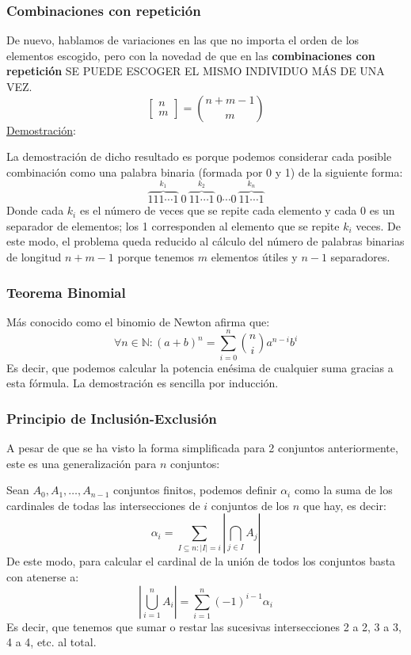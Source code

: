 \documentclass[10pt,a4paper,openright]{book}
\begin{document}
\subsubsection*{Combinaciones con repetición}
De nuevo, hablamos de variaciones en las que no importa el orden de los elementos escogido, pero con la novedad de que en las \textbf{combinaciones con repetición} SE PUEDE ESCOGER EL MISMO INDIVIDUO MÁS DE UNA VEZ. 
$$\begin{bmatrix} n \\ m\end{bmatrix} = \binom{n+m-1}{m}$$
\underline{Demostración}:

La demostración de dicho resultado es porque podemos considerar cada posible combinación como una palabra binaria (formada por 0 y 1) de la siguiente forma:
$$\overbrace{111\cdots 1}^{k_1} \ 0 \ \overbrace{11\cdots 1}^{k_2} \ 0 \cdots 0 \ \overbrace{11\cdots 1}^{k_n}$$
Donde cada $k_i$ es el número de veces que se repite cada elemento y cada $0$ es un separador de elementos; los 1 corresponden al elemento que se repite $k_i$ veces. De este modo, el problema queda reducido al cálculo del número de palabras binarias de longitud $n+m-1$ porque tenemos $m$ elementos útiles y $n-1$ separadores.

\subsubsection*{Teorema Binomial}
Más conocido como el binomio de Newton afirma que:
$$\forall n \in \mathbb N: (a+b)^n = \sum_{i = 0}^{n} \binom{n}{i} a^{n-i}b^i$$
Es decir, que podemos calcular la potencia enésima de cualquier suma gracias a esta fórmula. La demostración es sencilla por inducción.

\subsubsection*{Principio de Inclusión-Exclusión}
A pesar de que se ha visto la forma simplificada para 2 conjuntos anteriormente, este es una generalización para $n$ conjuntos:

Sean $A_0, A_1, \ldots, A_{n-1}$ conjuntos finitos, podemos definir $\alpha_i$ como la suma de los cardinales de todas las intersecciones de $i$ conjuntos de los $n$ que hay, es decir:
$$\alpha_i = \sum_{I\subseteq n: |I|=i} | \bigcap_{j\in I} A_j|$$
De este modo, para calcular el cardinal de la unión de todos los conjuntos basta con atenerse a:
$$|\bigcup_{i=1}^{n} A_i| = \sum_{i = 1}^{n} (-1)^{i-1}\alpha_i$$
Es decir, que tenemos que sumar o restar las sucesivas intersecciones 2 a 2, 3 a 3, 4 a 4, etc. al total.
\end{document}
